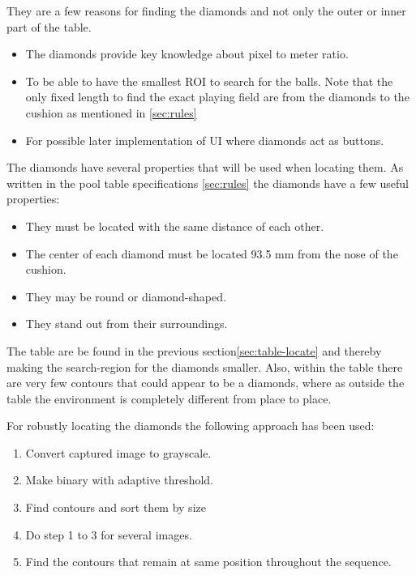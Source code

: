 They are a few reasons for finding the diamonds and not only the outer or inner part of the table.

\begin{itemize}
	\item The diamonds provide key knowledge about pixel to meter ratio.
	\item To be able to have the smallest ROI to search for the balls. Note that the only fixed length to find the exact playing field are from the diamonds to the cushion as mentioned in \ref{sec:rules}
	\item For possible later implementation of UI where diamonds act as buttons.
\end{itemize}

The diamonds have several properties that will be used when locating them. As written in the pool table specifications \ref{sec:rules} the diamonds have a few useful properties:

\begin{itemize}
	\item They must be located with the same distance of each other.
	\item The center of each diamond must be located 93.5 mm from the nose of the cushion.
	\item They may be round or diamond-shaped.
	\item They stand out from their surroundings.
\end{itemize}

The table are be found in the previous section\ref{sec:table-locate} and thereby making the search-region for the diamonds smaller. Also, within the table there are very few contours that could appear to be a diamonds, where as outside the table the environment is completely different from place to place.

For robustly locating the diamonds the following approach has been used:
\begin{enumerate}
	\item Convert captured image to grayscale.
	\item Make binary with adaptive threshold.
	\item Find contours and sort them by size
	\item Do step 1 to 3 for several images.
	\item Find the contours that remain at same position throughout the sequence.
\end{enumerate}


